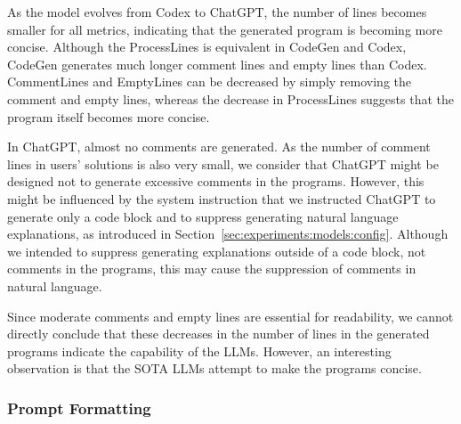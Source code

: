 \documentclass{article}
\begin{document}
As the model evolves from Codex to ChatGPT, the number of lines becomes smaller for all metrics, indicating that the generated program is becoming more concise.
Although the ProcessLines is equivalent in CodeGen and Codex, CodeGen generates much longer comment lines and empty lines than Codex.
CommentLines and EmptyLines can be decreased by simply removing the comment and empty lines, whereas the decrease in ProcessLines suggests that the program itself becomes more concise.

In ChatGPT, almost no comments are generated.
As the number of comment lines in users' solutions is also very small, we consider that ChatGPT might be designed not to generate excessive comments in the programs.
However, this might be influenced by the system instruction that we instructed ChatGPT to generate only a code block and to suppress generating natural language explanations, as introduced in Section~\ref{sec:experiments:models:config}.
Although we intended to suppress generating explanations outside of a code block, not comments in the programs, this may cause the suppression of comments in natural language.

Since moderate comments and empty lines are essential for readability, we cannot directly conclude that these decreases in the number of lines in the generated programs indicate the capability of the LLMs.
However, an interesting observation is that the SOTA LLMs attempt to make the programs concise.









\subsubsection{Prompt Formatting}
\label{sec:results:formatting:prompt}
\end{document}
